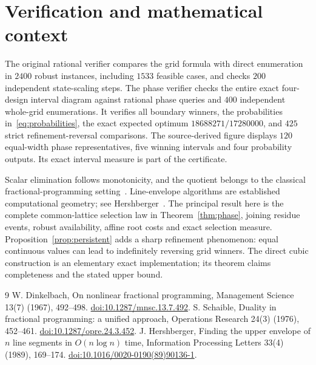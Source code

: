 \documentclass[11pt,a4paper]{article}
\begin{document}
\section{Verification and mathematical context}
The original rational verifier compares the grid formula with direct
enumeration in $2400$ robust instances, including $1533$ feasible cases,
and checks $200$ independent state-scaling steps. The phase verifier
checks the entire exact four-design interval diagram against rational
phase queries and $400$ independent whole-grid enumerations. It verifies
all boundary winners, the probabilities in~\eqref{eq:probabilities},
the exact expected optimum $18688271/17280000$, and $425$ strict
refinement-reversal comparisons. The source-derived figure displays
$120$ equal-width phase representatives, five winning intervals and four
probability outputs. Its exact interval measure is part of the certificate.

Scalar elimination follows monotonicity, and the quotient belongs to the
classical fractional-programming setting~\cite{dinkelbach,schaible}.
Line-envelope algorithms are established computational geometry; see
Hershberger~\cite{hershberger}. The principal result here is the complete
common-lattice selection law in Theorem~\ref{thm:phase}, joining residue
events, robust availability, affine root costs and exact selection measure.
Proposition~\ref{prop:persistent} adds a sharp refinement phenomenon: equal
continuous values can lead to indefinitely reversing grid winners.
The direct cubic construction is an elementary exact implementation;
its theorem claims completeness and the stated upper bound.

\begin{thebibliography}{9}
 W. Dinkelbach, On nonlinear fractional programming,
Management Science 13(7) (1967), 492--498.
\href{https://doi.org/10.1287/mnsc.13.7.492}{doi:10.1287/mnsc.13.7.492}.
 S. Schaible, Duality in fractional programming: a unified
approach, Operations Research 24(3) (1976), 452--461.
\href{https://doi.org/10.1287/opre.24.3.452}{doi:10.1287/opre.24.3.452}.
 J. Hershberger,
Finding the upper envelope of $n$ line segments in $O(n\log n)$ time,
Information Processing Letters 33(4) (1989), 169--174.
\href{https://doi.org/10.1016/0020-0190(89)90136-1}{doi:10.1016/0020-0190(89)90136-1}.
\end{thebibliography}
\end{document}
